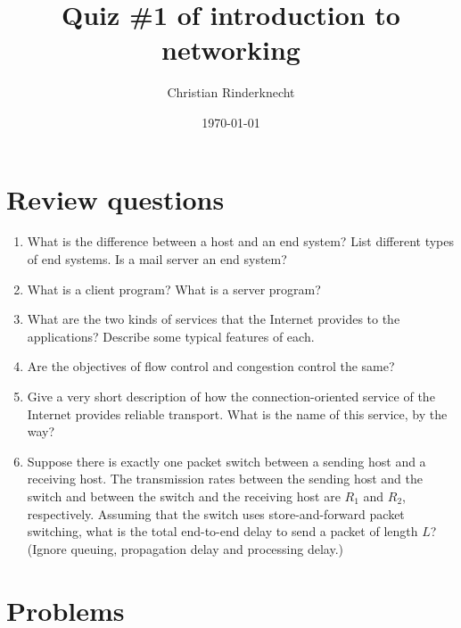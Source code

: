 \documentclass[11pt,a4paper]{article}
\title{Quiz \#1 of introduction to networking}
\author{Christian Rinderknecht}
\date{\today}
\begin{document}
\maketitle

\section{Review questions}

\begin{enumerate}

  \item What is the difference between a host and an end system? List
  different types of end systems. Is a mail server an end system?

  \item What is a client program? What is a server program?

  \item What are the two kinds of services that the Internet provides
  to the applications? Describe some typical features of each.

  \item Are the objectives of flow control and congestion control the
  same?

  \item Give a very short description of how the connection-oriented
  service of the Internet provides reliable transport. What is the
  name of this service, by the way?

  \item Suppose there is exactly one packet switch between a sending
  host and a receiving host. The transmission rates between the
  sending host and the switch and between the switch and the receiving
  host are \(R_1\) and \(R_2\), respectively. Assuming that the switch
  uses store-and-forward packet switching, what is the total
  end-to-end delay to send a packet of length \(L\)? (Ignore queuing,
  propagation delay and processing delay.)

\end{enumerate}

\section{Problems}
\end{document}
